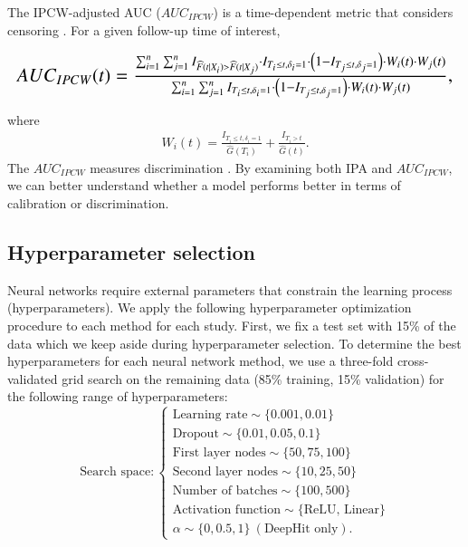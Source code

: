 \documentclass[preprint,12pt,authoryear]{elsarticle}
\begin{document}
The IPCW-adjusted AUC ($AUC_{IPCW}$) is a time-dependent metric that considers censoring \citep{auc}. For a given follow-up time of interest,

\begin{equation*}
\resizebox{\hsize}{!}{$AUC_{IPCW}(t)=\frac{\sum^{n}_{i=1}\sum^{n}_{j=1} I_{\widehat{F}(t|X_{i})>\widehat{F}(t|X_{j})} \cdot I_{T_{i}\leq t,\delta_{i}=1} \cdot \left( 1-I_{T_{j}\leq t,\delta_{j}=1} \right) \cdot W_{i}(t) \cdot W_{j}(t)} { \sum^{n}_{i=1}\sum^{n}_{j=1} I_{T_{i}\leq t,\delta_{i}=1} \cdot \left( 1-I_{T_{j}\leq t,\delta_{j}=1} \right) \cdot W_{i}(t) \cdot W_{j}(t) },$}
\end{equation*}

where \begin{align*}
W_{i}(t)=\frac{I_{T_{i}\leq t,\delta_{i}=1}}{\widehat{G}(T_{i})} +\frac{I_{T_{i}>t}}{\widehat{G}(t)}.
\end{align*} The $AUC_{IPCW}$ measures discrimination \citep{auc}. By examining both IPA and $AUC_{IPCW}$,
we can better understand whether a model performs better in terms of calibration or discrimination.

\hypertarget{hyperparameter-selection}{%
\subsection{Hyperparameter selection}\label{hyperparameter-selection}}

Neural networks require external parameters that constrain the learning process (hyperparameters). We apply the following hyperparameter optimization procedure to each method for each study. First, we fix a test set with 15\% of the data which we keep aside during hyperparameter selection. To determine the best hyperparameters for each neural network method, we use a three-fold cross-validated grid search on the remaining data (85\% training, 15\% validation) for the following range of hyperparameters:
\[
\textrm{Search space}: \begin{cases}
\textrm{Learning rate} \sim \{0.001, 0.01\} \\ 
\textrm{Dropout} \sim \{0.01,0.05, 0.1\} \\
\textrm{First layer nodes} \sim \{50, 75, 100\} \\
\textrm{Second layer nodes} \sim \{10,25,50\} \\
\textrm{Number of batches} \sim \{100, 500\} \\
\textrm{Activation function} \sim \{\textrm{ReLU, Linear}\}\\
\alpha \sim \{0, 0.5, 1\} \ (\textrm{DeepHit only}).
\end{cases}
\] 
\end{document}
